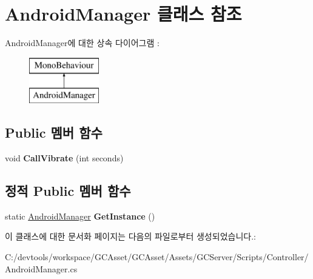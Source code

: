 \hypertarget{class_android_manager}{}\section{Android\+Manager 클래스 참조}
\label{class_android_manager}
Android\+Manager에 대한 상속 다이어그램 \+: \begin{figure}[H]
\begin{center}
\leavevmode
\includegraphics[height=2.000000cm]{class_android_manager}
\end{center}
\end{figure}
\subsection*{Public 멤버 함수}
\begin{DoxyCompactItemize}
\item 
\hypertarget{class_android_manager_a065b2fd453c42d8ffda3c18d92d47df6}{}void {\bfseries Call\+Vibrate} (int seconds)\label{class_android_manager_a065b2fd453c42d8ffda3c18d92d47df6}

\end{DoxyCompactItemize}
\subsection*{정적 Public 멤버 함수}
\begin{DoxyCompactItemize}
\item 
\hypertarget{class_android_manager_aedf12fa02a8fc5c00acf5d6aeed591ed}{}static \hyperlink{class_android_manager}{Android\+Manager} {\bfseries Get\+Instance} ()\label{class_android_manager_aedf12fa02a8fc5c00acf5d6aeed591ed}

\end{DoxyCompactItemize}


이 클래스에 대한 문서화 페이지는 다음의 파일로부터 생성되었습니다.\+:\begin{DoxyCompactItemize}
\item 
C\+:/devtools/workspace/\+G\+C\+Asset/\+G\+C\+Asset/\+Assets/\+G\+C\+Server/\+Scripts/\+Controller/Android\+Manager.\+cs\end{DoxyCompactItemize}
